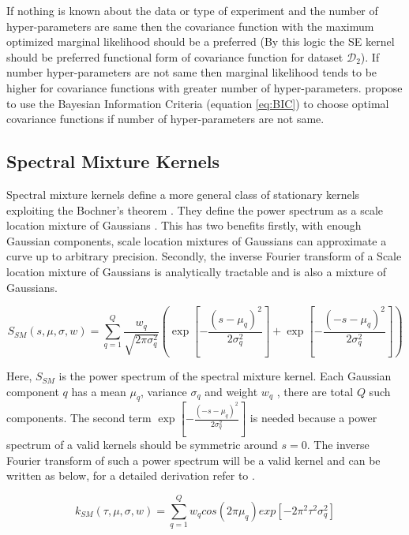 If nothing is known about the data or type of experiment and the number of hyper-parameters are same then the covariance function with the maximum optimized marginal likelihood should be a preferred (By this logic the SE kernel should be preferred functional form of covariance function for dataset \(\mathcal{D}_{2}\)). If number hyper-parameters are not same then marginal likelihood tends to be higher for covariance functions with greater number of hyper-parameters. \cite{duvenaud-thesis-2014, lloyd2014automatic} propose to use the Bayesian Information Criteria (equation \ref{eq:BIC}) to choose optimal covariance functions if number of hyper-parameters are not same. 

\subsection{Spectral Mixture Kernels}\label{subSecSMKernel}
Spectral mixture kernels define a more general class of stationary kernels exploiting the Bochner's theorem \cite{bochner1959lectures}. They define the power spectrum as a scale location mixture of Gaussians \cite{wilson2013gaussian}. This has two benefits firstly, with enough Gaussian components, scale location mixtures of Gaussians can approximate a curve up to arbitrary precision\cite{kostantinos2000gaussian, bishop2006pattern}. Secondly, the inverse Fourier transform of a Scale location mixture of Gaussians is analytically tractable and is also a mixture of Gaussians.

\begin{equation}\label{eqPowerSpectrumSSM}
    S_{SM}(s, \mu, \sigma, w) = \sum_{q=1}^{Q} \frac{w_{q}}{\sqrt{2\pi\sigma_{q}^2}}
\left ( \exp\left [ {-\frac{{(s-\mu_{q})^2}}{2\sigma_{q}^{2}}} \right ] + \exp\left [ {-\frac{{(-s-\mu_{q})^2}}{2\sigma_{q}^{2}}} \right ] \right  )
\end{equation}

Here, \( S_{SM}\) is the power spectrum of the spectral mixture kernel. Each Gaussian  component \(q\) has a mean \(\mu_{q}\), variance \(\sigma_{q}\) and weight \(w_{q}\) , there are total \(Q\) such components. The second term \(\exp\left [ {-\frac{{(-s-\mu_{q})^2}}{2\sigma_{q}^{2}}} \right ]\) is needed because a power spectrum of a valid kernels should be symmetric around \(s=0\). The inverse Fourier transform of such a power spectrum will be a valid kernel and can be written as below, for a detailed derivation refer to \cite{wilson2014thesis}.

\begin{equation}\label{eqCovarianceKSM}
k_{SM}(\tau, \mu, \sigma, w) = \sum_{q=1}^{Q}w_{q}cos(2\pi\mu_{q}) exp[-2\pi^{2}\tau^{2}\sigma_{q}^2]
\end{equation}

